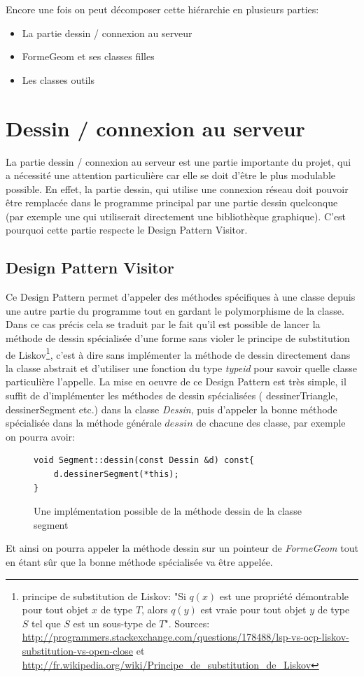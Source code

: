 \documentclass[10pt,a4paper]{report}
\begin{document}
\begin{spacing}{0.8}
Encore une fois on peut décomposer cette hiérarchie en plusieurs parties:
\begin{itemize}
\item La partie dessin / connexion au serveur
\item FormeGeom et ses classes filles
\item Les classes outils
\end{itemize}

\section{Dessin / connexion au serveur}
La partie dessin / connexion au serveur est une partie importante du projet, qui a nécessité une attention particulière car elle se doit d'être le plus modulable possible. En effet, la partie dessin, qui utilise une connexion réseau doit pouvoir être remplacée dans le programme principal par une partie dessin quelconque (par exemple une qui utiliserait directement une bibliothèque graphique). C'est pourquoi cette partie respecte le Design Pattern Visitor. 
\subsection{Design Pattern Visitor}
Ce Design Pattern permet d'appeler des méthodes spécifiques à une classe depuis une autre partie du programme tout en gardant le polymorphisme de la classe. Dans ce cas précis cela se traduit par le fait qu'il est possible de lancer la méthode de dessin spécialisée d'une forme sans violer le principe de substitution de Liskov\footnote{principe de substitution de Liskov: "Si $q(x)$ est une propriété démontrable pour tout objet $x$ de type $T$, alors $q(y)$ est vraie pour tout objet $y$ de type $S$ tel que $S$ est un sous-type de $T$". Sources: \url{http://programmers.stackexchange.com/questions/178488/lsp-vs-ocp-liskov-substitution-vs-open-close} et \url{http://fr.wikipedia.org/wiki/Principe_de_substitution_de_Liskov} }, c'est à dire sans implémenter la méthode de dessin directement dans la classe abstrait et d'utiliser une fonction du type \textit{typeid} pour savoir quelle classe particulière l'appelle.
La mise en oeuvre de ce Design Pattern est très simple, il suffit de d'implémenter les méthodes de dessin spécialisées ( dessinerTriangle, dessinerSegment etc.) dans la classe \textit{Dessin}, puis d'appeler la bonne méthode spécialisée dans la méthode générale $dessin$ de chacune des classe, par exemple on pourra avoir:
\begin{figure}[H]
\begin{verbatim}
void Segment::dessin(const Dessin &d) const{
    d.dessinerSegment(*this);
}
\end{verbatim}
\caption{Une implémentation possible de la méthode dessin de la classe segment}
\end{figure}
Et ainsi on pourra appeler la méthode dessin sur un pointeur de \textit{FormeGeom} tout en étant sûr que la bonne méthode spécialisée va être appelée.


\end{spacing}
\end{document}
